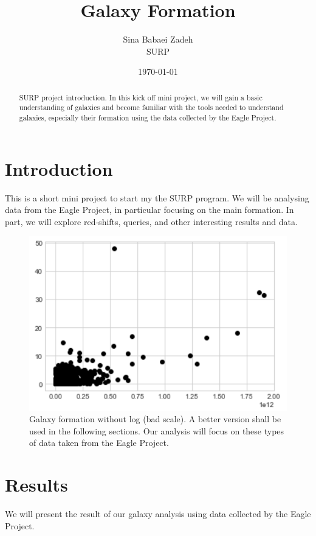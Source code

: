 \documentclass[12pt]{article}
\title{Galaxy Formation}
\author{Sina Babaei Zadeh\\SURP}
\date{\today}
\begin{document}
\maketitle

\begin{abstract}
SURP project introduction. In this kick off mini project, we will gain a basic understanding of galaxies and become familiar with the tools needed to understand galaxies, especially their formation using the data collected by the Eagle Project.
\end{abstract}
\tableofcontents
\clearpage 

\section{Introduction}
This is a short mini project to start my the SURP program. We will be analysing data from the Eagle Project, in particular focusing on the main formation. In part, we will explore red-shifts, queries, and other interesting results and data.
\begin{figure}
  \centerline{\includegraphics{Galaxy.jpg}}
  \caption{Galaxy formation without log (bad scale). A better version shall be used in the following sections. Our analysis will focus on these types of data taken from the Eagle Project.}
  \label{fig:picture}
\end{figure}




\section{Results}

We will present the result of our galaxy analysis using data collected by the Eagle Project. 
\end{document}
